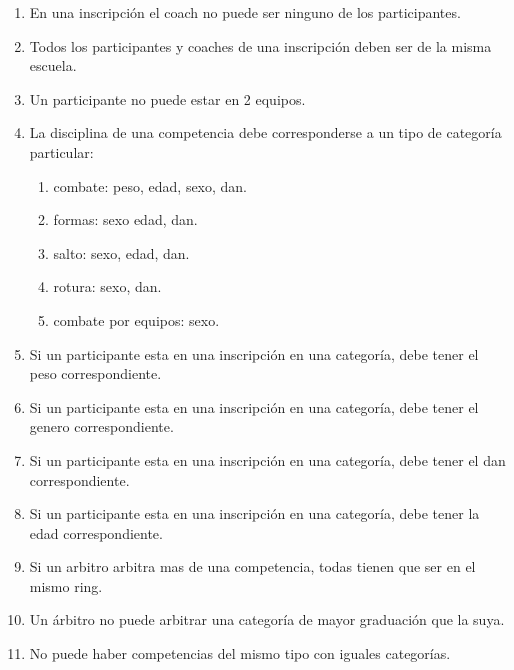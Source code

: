\begin{enumerate}
  \item En una inscripción el coach no puede ser ninguno de los participantes.
  \item Todos los participantes y coaches de una inscripción deben ser de la misma escuela.
  \item Un participante no puede estar en 2 equipos.
  \item La disciplina de una competencia debe corresponderse a un tipo de categoría particular: \begin{enumerate}
    \item combate: peso, edad, sexo, dan.
    \item formas: sexo edad, dan.
    \item salto: sexo, edad, dan.
    \item rotura: sexo, dan.
    \item combate por equipos: sexo. \end{enumerate}
  \item Si un participante esta en una inscripción en una categoría, debe tener el peso correspondiente.
  \item Si un participante esta en una inscripción en una categoría, debe tener el genero correspondiente.
  \item Si un participante esta en una inscripción en una categoría, debe tener el dan correspondiente.
  \item Si un participante esta en una inscripción en una categoría, debe tener la edad correspondiente.
  \item Si un arbitro arbitra mas de una competencia, todas tienen que ser en el mismo ring.
  \item Un árbitro no puede arbitrar una categoría de mayor graduación que la suya.
  \item No puede haber competencias del mismo tipo con iguales categorías.
\end{enumerate}

